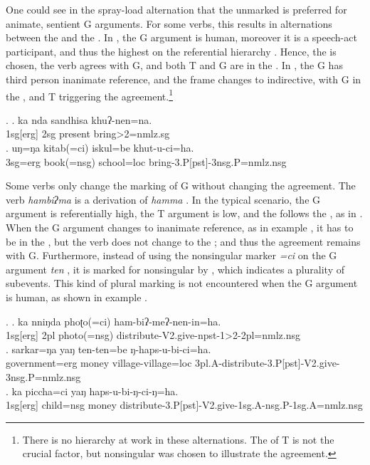 One could see in the spray-load alternation that the unmarked  is preferred for animate, sentient G arguments. For some verbs, this results in alternations between the  and the . In \Next[a], the G argument is human, moreover it is a speech-act participant, and thus the highest on the referential hierarchy \citep{Silverstein1976Hierarchy}. Hence, the  is chosen, the verb agrees with G, and both T and G are in the . In \Next[b], the G has third person inanimate reference, and the frame changes to indirective, with G in the , and T triggering the agreement.\footnote{There is no  hierarchy at work in these alternations. The  of T is not the crucial factor, but nonsingular was chosen to illustrate the agreement.}  

 \ex. \ag. ka nda sandhisa khuʔ-nen=na.\\
{\sc 1sg[erg]}  {\sc 2sg}  present{\sc }	bring{>2=nmlz.sg}\\
 	\bg. uŋ=ŋa  kitab(=ci) iskul=be khut-u-ci=ha.\\
		 {\sc 3sg=erg}  book{\sc (=nsg)} school{\sc =loc} bring{\sc -3.P[pst]-3nsg.P=nmlz.nsg}\\

	
Some verbs only change  the  marking of G without changing the agreement.  The verb \emph{hambiʔma}  is a  derivation of \emph{hamma} . In the typical scenario, the G argument is referentially high, the T argument is low, and the  follows the , as in \Next[a]. When the G argument changes to  inanimate reference, as in example \Next[b], it has to  be in the  , but the verb does not change to the ; and thus the agreement remains with G. Furthermore, instead of using the nonsingular marker \emph{=ci} on the G argument \emph{ten} , it is marked for nonsingular  by , which indicates a plurality of subevents. This kind of plural marking is not encountered when the G argument is human, as shown in example \Next[c].

\ex. \ag. ka nniŋda phoʈo(=ci) ham-biʔ-meʔ-nen-in=ha.\\
		{\sc 1sg[erg]} {\sc 2pl} photo{\sc (=nsg)} distribute{\sc -V2.give-npst-1>2-2pl=nmlz.nsg}	\\
 	\bg. sarkar=ŋa yaŋ ten-ten=be ŋ-haps-u-bi-ci=ha.\\
	government{\sc =erg} money village-village{\sc =loc}	{\sc 3pl.A-}distribute{\sc -3.P[pst]-V2.give-3nsg.P=nmlz.nsg}\\
		\bg. ka piccha=ci yaŋ haps-u-bi-ŋ-ci-ŋ=ha.\\
	{\sc 1sg[erg]}  child{\sc =nsg} money{\sc }	distribute{\sc -3.P[pst]-V2.give-1sg.A-nsg.P-1sg.A=nmlz.nsg}\\

